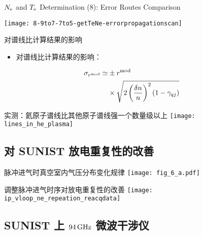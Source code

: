 \begin{CJK*}{UTF8}{kai}
\begin{frame}{$N_{\rm e}$ and $T_{\rm e}$ Determination (8): Error Routes Comparison}
	\vspace{-0.3cm}
	\begin{center}
		\texttt{[image: 8-9to7-7to5-getTeNe-errorpropagationscan]}
	\end{center}
\end{frame}


\begin{frame}{对谱线比计算结果的影响}
	\begin{itemize}
        \item 对谱线比计算结果的影响：
    \end{itemize}
    \begin{align*}
    \sigma_{r^{\rm mod}} \simeq & \pm r^{\rm mod} \\
    & \times\sqrt{2\left(\frac{\delta n}{n}\right)^2(1-\gamma_{qj})}
    \end{align*}

\end{frame}

\begin{frame}{实测：氦原子谱线比其他原子谱线强一个数量级以上}
	\centering
	\texttt{[image: lines\_in\_he\_plasma]}
\end{frame}

\subsection{对 SUNIST 放电重复性的改善}

\begin{frame}{脉冲进气时真空室内气压分布变化规律}
	\centering
	\texttt{[image: fig\_6\_a.pdf]}\\
\end{frame}

\begin{frame}{调整脉冲进气时序对放电重复性的改善}
	\centering
	\texttt{[image: ip\_vloop\_ne\_repeation\_reacqdata]}
\end{frame}

\subsection{SUNIST 上 $94\,{\rm GHz}$ 微波干涉仪}


\end{CJK*}
